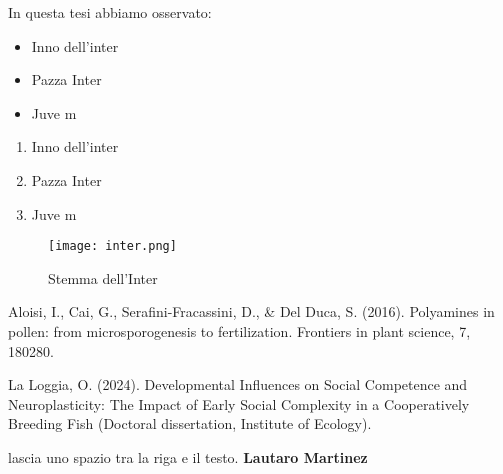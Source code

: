 \documentclass[12pt]{article}
\begin{document}
In questa tesi abbiamo osservato:
\begin{itemize} %
    \item Inno dell'inter
    \item Pazza Inter
    \item Juve m
\end{itemize} %

\begin{enumerate} %
    \item Inno dell'inter
    \item Pazza Inter
    \item Juve m
\end{enumerate}

\newpage %


\begin{figure}
    \centering %
    \texttt{[image: inter.png]} %
    \caption{Stemma dell'Inter} %
    \label{fig:chagall} %
\end{figure}

\newpage
\begin{thebibliography}{999} %
    
    Aloisi, I., Cai, G., Serafini-Fracassini, D., \& Del Duca, S. (2016). Polyamines in pollen: from microsporogenesis to fertilization. Frontiers in plant science, 7, 180280. %
    
    La Loggia, O. (2024). Developmental Influences on Social Competence and Neuroplasticity: The Impact of Early Social Complexity in a Cooperatively Breeding Fish (Doctoral dissertation, Institute of Ecology).

\end{thebibliography}

\newpage

\hline %
\bigskip
lascia uno spazio tra la riga e il testo.
\textbf{Lautaro Martinez}
\bigskip
\hline %
\end{document}
